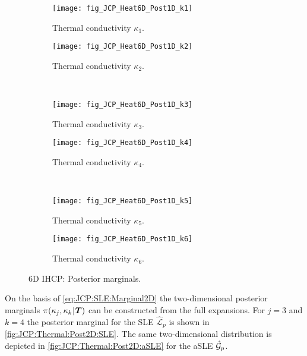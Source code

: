 \begin{figure}[htbp]
  \centering
  \begin{subfigure}[b]{\JCPsubWidth}
    \centering
    \texttt{[image: fig\_JCP\_Heat6D\_Post1D\_k1]}
    \caption{Thermal conductivity \(\kappa_1\).}
    \label{fig:JCP:Thermal:Post1D:k1}
  \end{subfigure}\hfill%
  \begin{subfigure}[b]{\JCPsubWidth}
    \centering
    \texttt{[image: fig\_JCP\_Heat6D\_Post1D\_k2]}
    \caption{Thermal conductivity \(\kappa_2\).}
    \label{fig:JCP:Thermal:Post1D:k2}
  \end{subfigure}\\[3ex]%
  \begin{subfigure}[b]{\JCPsubWidth}
    \centering
    \texttt{[image: fig\_JCP\_Heat6D\_Post1D\_k3]}
    \caption{Thermal conductivity \(\kappa_3\).}
    \label{fig:JCP:Thermal:Post1D:k3}
  \end{subfigure}\hfill%
  \begin{subfigure}[b]{\JCPsubWidth}
    \centering
    \texttt{[image: fig\_JCP\_Heat6D\_Post1D\_k4]}
    \caption{Thermal conductivity \(\kappa_4\).}
    \label{fig:JCP:Thermal:Post1D:k4}
  \end{subfigure}\\[3ex]%
  \begin{subfigure}[b]{\JCPsubWidth}
    \centering
    \texttt{[image: fig\_JCP\_Heat6D\_Post1D\_k5]}
    \caption{Thermal conductivity \(\kappa_5\).}
    \label{fig:JCP:Thermal:Post1D:k5}
  \end{subfigure}\hfill%
  \begin{subfigure}[b]{\JCPsubWidth}
    \centering
    \texttt{[image: fig\_JCP\_Heat6D\_Post1D\_k6]}
    \caption{Thermal conductivity \(\kappa_6\).}
    \label{fig:JCP:Thermal:Post1D:k6}
  \end{subfigure}%
  \caption[6D IHCP: Posterior marginals]{6D IHCP: Posterior marginals.}
  \label{fig:JCP:Thermal:Post1D}
\end{figure}
\par %
On the basis of \cref{eq:JCP:SLE:Marginal2D} the two-dimensional posterior marginals \(\pi(\kappa_j,\kappa_k {\:\!}|{\:\!} \bm{T})\) can be constructed from the full expansions.
For \(j = 3\) and \(k = 4\) the posterior marginal for the SLE \(\hat{\mathcal{L}}_p\) is shown in \cref{fig:JCP:Thermal:Post2D:SLE}.
The same two-dimensional distribution is depicted in \cref{fig:JCP:Thermal:Post2D:aSLE} for the aSLE \(\hat{\mathcal{G}}_p\).
